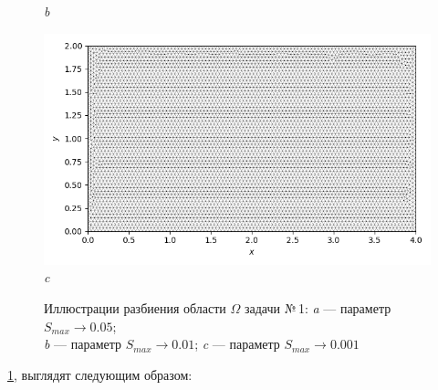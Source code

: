 \documentclass[12pt, a4paper]{article}
\begin{document}
\begin{figure}[h]
\begin{center}
{\begin{minipage}{0.45\textwidth}
									\textit{b} 
								\end{minipage}                                 
							} 
							{ 
								\begin{minipage}{0.7\textwidth} 
									\centering 
									\includegraphics[width=1\columnwidth]{rect_dirichlet_only_0001_calfem_net.png}\\ 
									\textit{c} 
								\end{minipage}                                 
							} 						
						\end{center} 
						\vspace*{-0.0mm} 
						\caption{Иллюстрации разбиения области $\Omega$ задачи №\,1: 
							\textit{a} --- параметр $S_{max} \rightarrow 0.05$;\\
							\textit{b} --- параметр $S_{max} \rightarrow  0.01$;
							\textit{c} --- параметр $S_{max} \rightarrow 0.001$
						} 
						\label{fig: meshs_for_rect}
					\end{figure}
					
					\ref{fig: meshs_for_rect}, выглядят следующим образом:
		
			
			
			
			
\end{document}
